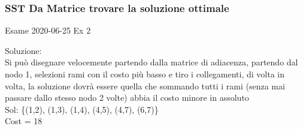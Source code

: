 \documentclass{article}
\begin{document}
\subsubsection{SST Da Matrice trovare la soluzione ottimale}
Esame 2020-06-25 Ex 2\\

\noindent{}%

Soluzione:\\

Si può disegnare velocemente partendo dalla matrice di adiacenza, partendo dal nodo 1, selezioni rami con il costo più basso e tiro i collegamenti, di volta in volta, la soluzione dovrà essere quella che sommando tutti i rami (senza mai passare dallo stesso nodo 2 volte) abbia il costo minore in assoluto
\\
Sol: \{(1,2), (1,3), (1,4), (4,5), (4,7), (6,7)\}\\
Cost = 18
\\

\begin{center}
\end{center}
\end{document}
